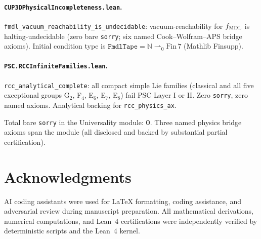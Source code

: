 \documentclass[11pt]{article}
\begin{document}
\paragraph{\texttt{CUP3DPhysicalIncompleteness.lean}.}
\texttt{fmdl\_vacuum\_reachability\_is\_undecidable}: vacuum-reachability for $f_{\rm MDL}$ is halting-undecidable (zero bare \texttt{sorry}; six named Cook--Wolfram--APS bridge axioms). Initial condition type is $\mathtt{FmdlTape}=\mathbb{N}\rightharpoonup_{\!0}\mathrm{Fin}\,7$ (Mathlib Finsupp).

\paragraph{\texttt{PSC.RCCInfiniteFamilies.lean}.}
\texttt{rcc\_analytical\_complete}: all compact simple Lie families (classical and all five exceptional groups G$_2$, F$_4$, E$_6$, E$_7$, E$_8$) fail PSC Layer I or II. Zero \texttt{sorry}, zero named axioms. Analytical backing for \texttt{rcc\_physics\_ax}.

Total bare \texttt{sorry} in the Universality module: \textbf{0}. Three named physics bridge axioms span the module (all disclosed and backed by substantial partial certification).

\section*{Acknowledgments}

AI coding assistants were used for LaTeX formatting, coding assistance, and adversarial review during manuscript preparation. All mathematical derivations, numerical computations, and Lean~4 certifications were independently verified by deterministic scripts and the Lean~4 kernel.



\end{document}
